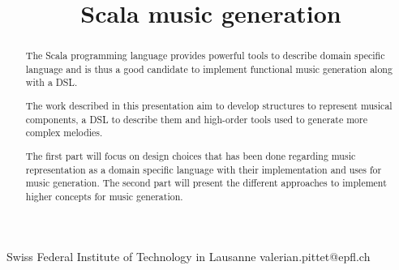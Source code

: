 \documentclass[preprint]{sigplanconf}
\begin{document}
\newcommand{\lln}[1]{
  \lstinline@#1@
}
\setlength{\pdfpageheight}{\paperheight}
\setlength{\pdfpagewidth}{\paperwidth}






\title{Scala music generation}

           {Swiss Federal Institute of Technology in Lausanne}
           {valerian.pittet@epfl.ch\
           }

\maketitle

\begin{abstract}


The Scala programming language provides powerful tools to describe domain specific language and is thus a good candidate to implement functional music generation along with a DSL.

The work described in this presentation aim to develop structures to represent musical components, a DSL to describe them and high-order tools used to generate more complex melodies.

The first part will focus on design choices that has been done regarding music representation as a domain specific language with their implementation and uses for music generation. The second part will present the different approaches to implement higher concepts for music generation.

\end{abstract}
\end{document}

